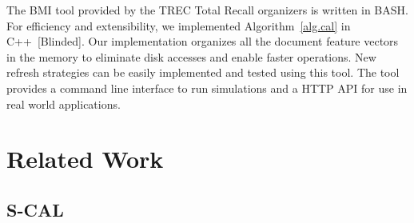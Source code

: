 The BMI tool provided by the TREC Total Recall organizers is written in BASH.
For efficiency and extensibility, we implemented Algorithm~\ref{alg.cal} in
C++~[Blinded]. Our implementation organizes all the document feature vectors in
the memory to eliminate disk accesses and enable faster operations. New refresh
strategies can be easily implemented and tested using this tool. The tool
provides a command line interface to run simulations and a HTTP API for use in
real world applications.

\section{Related Work}
\subsection{S-CAL}
